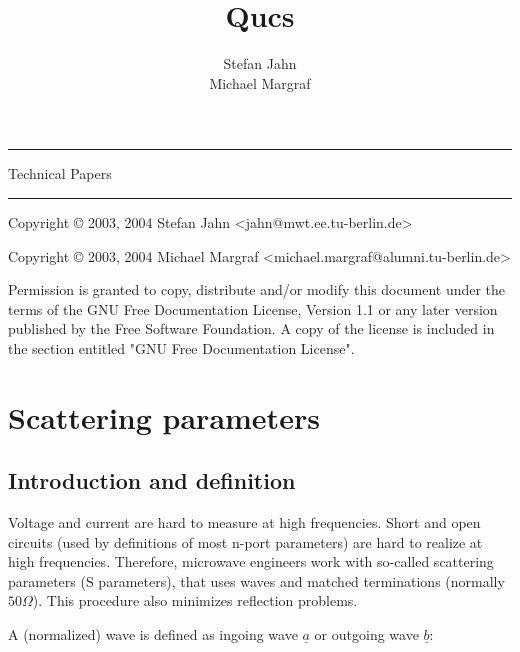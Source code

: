 \documentclass[10pt]{report}
\author{Stefan Jahn\vspace*{6pt}\\Michael Margraf}
\title{Qucs}
\date{}
\makeatletter
\renewcommand{\maketitle}{\begin{titlepage}%
    \setlength{\parindent}{0pt}
    \vspace*{3cm}
    \begin{flushleft}
      \textbf{\begin{huge}\@title\end{huge}}
    \end{flushleft}
    \hrule height 3pt
    \begin{flushright}
      \begin{LARGE}Technical Papers\end{LARGE}
    \end{flushright}
    \vfill
    \begin{flushright}
      \begin{Large}\@author\end{Large}
    \end{flushright}
    \hrule height 3pt
    \vspace*{24pt}

Copyright \copyright{} 2003, 2004 Stefan Jahn
\textless jahn@mwt.ee.tu-berlin.de\textgreater

Copyright \copyright{} 2003, 2004 Michael Margraf
\textless michael.margraf@alumni.tu-berlin.de\textgreater

    \vspace*{12pt}

Permission is granted to copy, distribute and/or modify this document
under the terms of the GNU Free Documentation License, Version 1.1 or
any later version published by the Free Software Foundation.  A copy
of the license is included in the section entitled "GNU Free
Documentation License".

    \vspace*{1cm}

    \end{titlepage}%
    \setcounter{footnote}{0}%
}
\makeatother
\begin{document}
\maketitle

\tableofcontents

\setlength{\parindent}{0pt}
\newpage

\chapter{Scattering parameters}

\section{Introduction and definition}

Voltage and current are hard to measure at high frequencies.  Short
and open circuits (used by definitions of most n-port parameters) are
hard to realize at high frequencies.  Therefore, microwave engineers
work with so-called scattering parameters (S parameters), that uses
waves and matched terminations (normally $50 \Omega$).  This procedure
also minimizes reflection problems.

\addvspace{12pt}

A (normalized) wave is defined as ingoing wave $\underline{a}$ or
outgoing wave $\underline{b}$:
\end{document}
